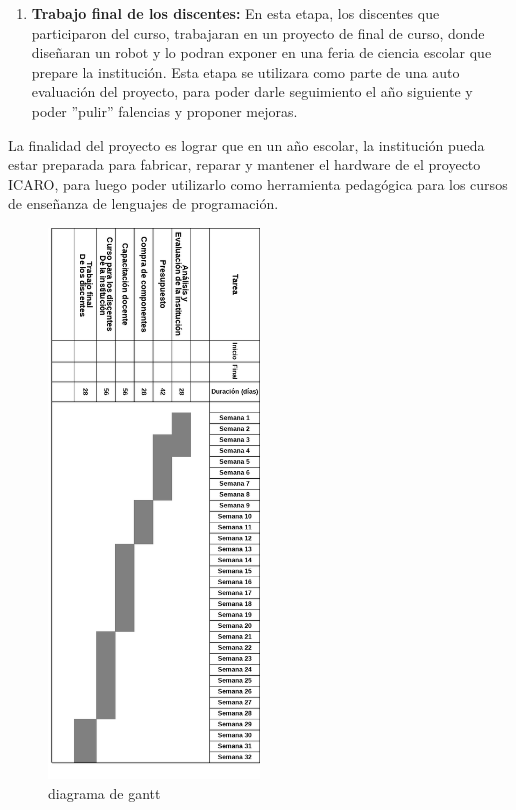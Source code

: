 \begin{enumerate}
  \item \textbf{Trabajo final de los discentes:} En esta etapa, los discentes que participaron del curso, trabajaran en un proyecto de final de curso, donde diseñaran un robot y lo podran exponer en una feria de ciencia escolar que prepare la institución. Esta etapa se utilizara como parte de una auto evaluación del proyecto, para poder darle seguimiento el año siguiente y poder ''pulir'' falencias y proponer mejoras.   
\end{enumerate}

La finalidad del proyecto es lograr que en un año escolar, la institución pueda estar preparada para fabricar, reparar y mantener el hardware de el proyecto ICARO, para luego poder utilizarlo como herramienta pedagógica para los cursos de enseñanza de lenguajes de programación.

\begin{figure}[H]
  \begin{center}
    \includegraphics[width=0.5\textwidth]{./figuras/gantt2.png}
    \caption{diagrama de gantt}
    \label{fig:gantt}
  \end{center}
\end{figure}


